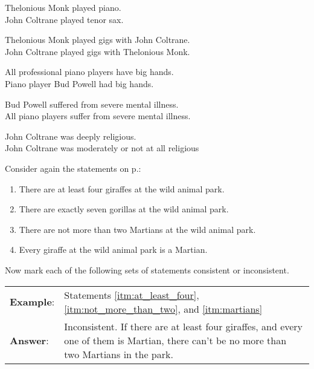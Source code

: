 \begin{exercises}
\item  Thelonious Monk played piano.	\\
John Coltrane played tenor sax.

\item  Thelonious Monk played gigs with John Coltrane.	\\
	John Coltrane played gigs with Thelonious Monk.

\item  All professional piano players have big hands.	\\
	Piano player Bud Powell had big hands.

\item  Bud Powell suffered from severe mental illness.	 \\
	All piano players suffer from severe mental illness.

\item John Coltrane was deeply religious.	 \\
John Coltrane was moderately or not at all religious
\end{exercises}


\noindent \problempart Consider again the statements on p.\pageref{MartianGiraffes}:
\begin{enumerate}[label=(\alph*)]
\item \label{itm:at_least_four}There are at least four giraffes at the wild animal park.
\item \label{itm:exactly_seven} There are exactly seven gorillas at the wild animal park.
\item \label{itm:not_more_than_two} There are not more than two Martians at the wild animal park.
\item \label{itm:martians} Every giraffe at the wild animal park is a Martian.
\end{enumerate}
Now mark each of the following sets of statements consistent or inconsistent.
\begin{longtabu}{p{.1\linewidth}p{.9\linewidth}}
\textbf{Example}: & Statements \ref{itm:at_least_four}, \ref{itm:not_more_than_two}, and \ref{itm:martians}\\
\textbf{Answer}: & Inconsistent. If there are at least four giraffes, and every one of them is Martian, there can't be no more than two Martians in the park.\\
\end{longtabu}



